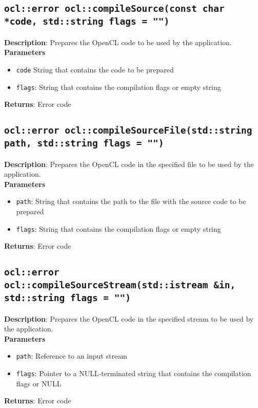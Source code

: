 \subsection{\texttt{ocl::error ocl::compileSource(const char *code, std::string flags = "")}}

\textbf{Description}: Prepares the OpenCL code to be used by the application. \\
\textbf{Parameters}
\begin{itemize}
  \item \texttt{code} String that contains the code to be prepared
  \item \texttt{flags}: String that contains the compilation flags or empty string
\end{itemize}
\textbf{Returns}: Error code

\subsection{\texttt{ocl::error ocl::compileSourceFile(std::string path, std::string flags = "")}}

\textbf{Description}: Prepares the OpenCL code in the specified file to be used by the application.  \\
\textbf{Parameters}
\begin{itemize}
  \item \texttt{path}: String that contains the path to the file with the source code to be prepared
  \item \texttt{flags}: String that contains the compilation flags or empty string
\end{itemize}
\textbf{Returns}: Error code

\subsection{\texttt{ocl::error ocl::compileSourceStream(std::istream \&in, std::string flags = "")}}

\textbf{Description}: Prepares the OpenCL code in the specified stream to be used by the 
application.  \\
\textbf{Parameters}
\begin{itemize}
  \item \texttt{path}: Reference to an input stream
  \item \texttt{flags}: Pointer to a NULL\hyp{}terminated string that contains the compilation flags or NULL
\end{itemize}
\textbf{Returns}: Error code

